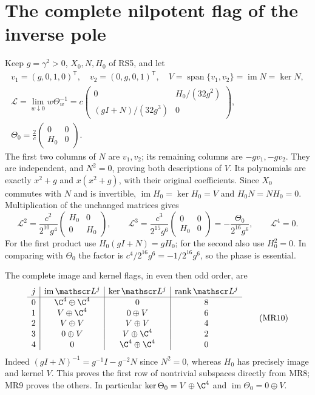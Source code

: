 \section{The complete nilpotent flag of the inverse pole}
Keep $g=\gamma^2>0$, $X_0,N,H_0$ of RS5, and let
\begin{equation}
 \begin{gathered}
 v_1=(g,0,1,0)^{\mathsf T},\quad
 v_2=(0,g,0,1)^{\mathsf T},\quad
 V=\operatorname{span}\{v_1,v_2\}=\operatorname{im}N=\ker N,\\
 \mathscr L=\lim_{w\downarrow0}w\Theta_w^{-1}
 =c\begin{pmatrix}0&H_0/(32g^2)\\(gI+N)/(32g^3)&0\end{pmatrix},\\
 \Theta_0=\frac2c\begin{pmatrix}0&0\\H_0&0\end{pmatrix}.
 \end{gathered}\tag{MR8}
\end{equation}
The first two columns of $N$ are $v_1,v_2$; its remaining
columns are $-gv_1,-gv_2$. They are independent, and $N^2=0$,
proving both descriptions of $V$. Its polynomials are exactly
$x^2+g$ and $x(x^2+g)$, with their original coefficients.
Since $X_0$ commutes with $N$ and is invertible,
$\operatorname{im}H_0=\ker H_0=V$ and $H_0N=NH_0=0$.
Multiplication of the unchanged matrices gives
\begin{equation}
 \mathscr L^2=\frac{c^2}{2^{10}g^4}
            \begin{pmatrix}H_0&0\\0&H_0\end{pmatrix},\qquad
 \mathscr L^3=\frac{c^3}{2^{15}g^6}
            \begin{pmatrix}0&0\\H_0&0\end{pmatrix}
       =-\frac{\Theta_0}{2^{16}g^6},\qquad
 \mathscr L^4=0.
 \tag{MR9}
\end{equation}
For the first product use $H_0(gI+N)=gH_0$; for the second
also use $H_0^2=0$. In comparing with $\Theta_0$ the factor
is $c^4/2^{16}g^6=-1/2^{16}g^6$, so the phase is essential.

The complete image and kernel flags, in even then odd order, are
\begin{equation}
 \begin{array}{c|c|c|c}
 j&\operatorname{im}\mathscr L^j&\ker\mathscr L^j&
     \operatorname{rank}\mathscr L^j\\\hline
 0&\C^4\oplus\C^4&0&8\\
 1&V\oplus\C^4&0\oplus V&6\\
 2&V\oplus V&V\oplus V&4\\
 3&0\oplus V&V\oplus\C^4&2\\
 4&0&\C^4\oplus\C^4&0
 \end{array}
 \tag{MR10}
\end{equation}
Indeed $(gI+N)^{-1}=g^{-1}I-g^{-2}N$ since $N^2=0$,
whereas $H_0$ has precisely image and kernel $V$. This proves
the first row of nontrivial subspaces directly from MR8;
MR9 proves the others. In particular
$\ker\Theta_0=V\oplus\C^4$ and
$\operatorname{im}\Theta_0=0\oplus V$.

